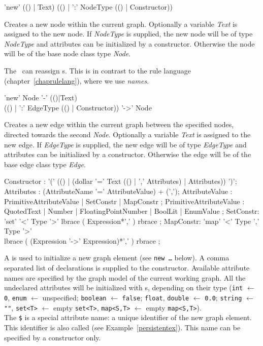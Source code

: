 \begin{rail}
  'new' (() | Text) (() | ':' NodeType (() | Constructor))
\end{rail}
Creates a new node within the current graph.
Optionally a variable \emph{Text} is assigned to the new node.
If \emph{NodeType} is supplied, the new node will be of type \emph{NodeType} and attributes can be initialized by a constructor.
Otherwise the node will be of the base node class type \emph{Node}.
\begin{note}
The \GrShell\ can reassign s. 
This is in contrast to the rule language (chapter~\ref{chaprulelang}), where we use \emph{names}.
\end{note}

\begin{rail}
  'new' Node '-' (()|Text) \\ (() | ':' EdgeType (() | Constructor)) '->' Node
\end{rail}
Creates a new edge within the current graph between the specified nodes, directed towards the second \emph{Node}.
Optionally a variable \emph{Text} is assigned to the new edge.
If \emph{EdgeType} is supplied, the new edge will be of type \emph{EdgeType} and attributes can be initialized by a constructor.
Otherwise the edge will be of the base edge class type \emph{Edge}.

\begin{rail}
  Constructor : '(' (() | (dollar '=' Text (() | ',' Attributes) | Attributes)) ')';
  Attributes : (AttributeName '=' AttributeValue) + (',');
  AttributeValue :  PrimitiveAttributeValue | SetConstr | MapConstr ;
  PrimitiveAttributeValue : QuotedText | Number | FloatingPointNumber | BoolLit | EnumValue ;
  SetConstr: 'set' '<' Type '>' lbrace ( Expression*',' ) rbrace ;
  MapConstr: 'map' '<' Type ',' Type '>' \\ lbrace ( (Expression '->' Expression)*',' ) rbrace ;
\end{rail}\indexmain{\texttt{\$}}
A  is used to initialize a new graph element (see \texttt{new \dots} below).
A comma separated list of  declarations is supplied to the constructor.
Available attribute names are specified by the graph model of the current working graph.
All the undeclared attributes will be initialized with s, depending on their type 
(\texttt{int} $\leftarrow$ \texttt{0}, \texttt{enum} $\leftarrow$ unspecified; \texttt{boolean} $\leftarrow$ \texttt{false}; \texttt{float}, \texttt{double} $\leftarrow$ \texttt{0.0}; \texttt{string} $\leftarrow$ \texttt{""}, \texttt{set<T>} $\leftarrow$ empty \texttt{set<T>}, \texttt{map<S,T>} $\leftarrow$ empty \texttt{map<S,T>}).\\
The \texttt{\$} is a special attribute name: a unique identifier of the new graph element.
This identifier is also called  (see Example~\ref{persistentex}).
This name can be specified by a constructor only.

